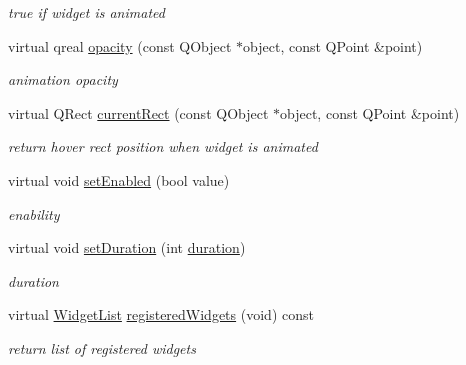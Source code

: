 \begin{DoxyCompactItemize}
\begin{DoxyCompactList}\small\item\em true if widget is animated \end{DoxyCompactList}\item 
\mbox{\label{class_menu_bar_engine_v1_a6af049c47498947441daa75468b7c616}} 
virtual qreal \hyperlink{class_menu_bar_engine_v1_a6af049c47498947441daa75468b7c616}{opacity} (const Q\+Object $\ast$object, const Q\+Point \&point)
\begin{DoxyCompactList}\small\item\em animation opacity \end{DoxyCompactList}\item 
\mbox{\label{class_menu_bar_engine_v1_a520b6b55ec58195e9a3a4c0ab3ae3384}} 
virtual Q\+Rect \hyperlink{class_menu_bar_engine_v1_a520b6b55ec58195e9a3a4c0ab3ae3384}{current\+Rect} (const Q\+Object $\ast$object, const Q\+Point \&point)
\begin{DoxyCompactList}\small\item\em return \textquotesingle{}hover\textquotesingle{} rect position when widget is animated \end{DoxyCompactList}\item 
\mbox{\label{class_menu_bar_engine_v1_a8ecca1e74d8909074901b002c99283d2}} 
virtual void \hyperlink{class_menu_bar_engine_v1_a8ecca1e74d8909074901b002c99283d2}{set\+Enabled} (bool value)
\begin{DoxyCompactList}\small\item\em enability \end{DoxyCompactList}\item 
\mbox{\label{class_menu_bar_engine_v1_ab0c21c3072e38f178fb4a7533e7d7815}} 
virtual void \hyperlink{class_menu_bar_engine_v1_ab0c21c3072e38f178fb4a7533e7d7815}{set\+Duration} (int \hyperlink{class_base_engine_a7edb8da9d2fd6cca19682d1d089dfa4b}{duration})
\begin{DoxyCompactList}\small\item\em duration \end{DoxyCompactList}\item 
\mbox{\label{class_menu_bar_engine_v1_affc80fc4a2e472edd640abb7e1422a5c}} 
virtual \hyperlink{class_base_engine_a2b0faec98a7eb68c91b502459c46a9c7}{Widget\+List} \hyperlink{class_menu_bar_engine_v1_affc80fc4a2e472edd640abb7e1422a5c}{registered\+Widgets} (void) const
\begin{DoxyCompactList}\small\item\em return list of registered widgets \end{DoxyCompactList}\end{DoxyCompactItemize}
